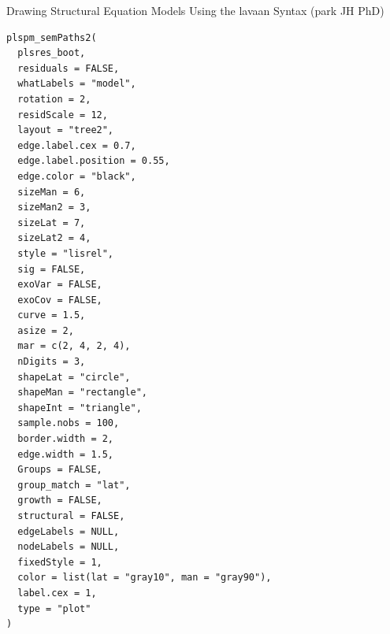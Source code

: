 \documentclass[a4paper]{book}
\begin{document}
%
\begin{Description}
Drawing Structural Equation Models Using the lavaan Syntax (park JH PhD)
\end{Description}
%
\begin{Usage}
\begin{verbatim}
plspm_semPaths2(
  plsres_boot,
  residuals = FALSE,
  whatLabels = "model",
  rotation = 2,
  residScale = 12,
  layout = "tree2",
  edge.label.cex = 0.7,
  edge.label.position = 0.55,
  edge.color = "black",
  sizeMan = 6,
  sizeMan2 = 3,
  sizeLat = 7,
  sizeLat2 = 4,
  style = "lisrel",
  sig = FALSE,
  exoVar = FALSE,
  exoCov = FALSE,
  curve = 1.5,
  asize = 2,
  mar = c(2, 4, 2, 4),
  nDigits = 3,
  shapeLat = "circle",
  shapeMan = "rectangle",
  shapeInt = "triangle",
  sample.nobs = 100,
  border.width = 2,
  edge.width = 1.5,
  Groups = FALSE,
  group_match = "lat",
  growth = FALSE,
  structural = FALSE,
  edgeLabels = NULL,
  nodeLabels = NULL,
  fixedStyle = 1,
  color = list(lat = "gray10", man = "gray90"),
  label.cex = 1,
  type = "plot"
)
\end{verbatim}
\end{Usage}
%
\end{document}
